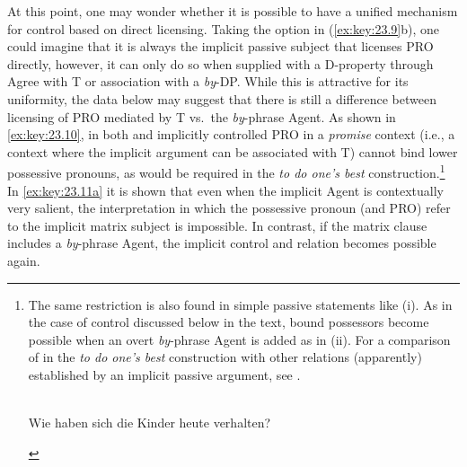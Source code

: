 \documentclass[output=paper]{langsci/langscibook}
\begin{document}
At this point, one may wonder whether it is possible to have a unified
mechanism for control based on direct licensing. Taking the option in
(\ref{ex:key:23.9}b), one could imagine that it is always the implicit passive
subject that licenses PRO directly, however, it can only do so when supplied
with a D-property through Agree with T or association with a \emph{by}-DP.
While this is attractive for its uniformity, the data below may suggest that
there is still a difference between licensing of PRO mediated by T vs.\ the
\emph{by}-phrase Agent. As shown in \eqref{ex:key:23.10}, in both 
and  implicitly controlled PRO in a \emph{promise} context (i.e., a
context where the implicit argument can be associated with T) cannot bind lower
possessive pronouns, as would be required in the \emph{to do one’s best}
construction.\footnote{The same restriction is also found in simple passive
    statements like (i). As in the case of control discussed below in the text,
    bound possessors become possible when an overt \emph{by}-phrase Agent is
    added as in (ii). For a comparison of  in the \emph{to do one’s
    best} construction with other  relations (apparently) established by
    an implicit passive argument, see \citet{Wurmbrand2016}.

\begin{exe}
     \\
    Wie haben sich die Kinder heute verhalten?
    \begin{xlist}
    \end{xlist}
\end{exe}} In \eqref{ex:key:23.11a} it is shown that even when the implicit
Agent is contextually very salient, the interpretation in which the possessive
pronoun (and PRO) refer to the implicit matrix subject is impossible. In
contrast, if the matrix clause includes a \emph{by}-phrase Agent, the implicit
control and  relation becomes possible again.\largerpage[1]
\end{document}
